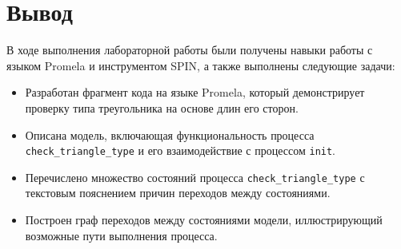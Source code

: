 \documentclass{bmstu}
\begin{document}
\clearpage
\section{Вывод}

В ходе выполнения лабораторной работы были получены навыки работы с языком Promela и инструментом SPIN, а также выполнены следующие задачи:
\begin{itemize}
  \item Разработан фрагмент кода на языке Promela, который демонстрирует проверку типа треугольника на основе длин его сторон.
  \item Описана модель, включающая функциональность процесса \texttt{check\_triangle\_type} и его взаимодействие с процессом \texttt{init}.
  \item Перечислено множество состояний процесса \texttt{check\_triangle\_type} с текстовым пояснением причин переходов между состояниями.
  \item Построен граф переходов между состояниями модели, иллюстрирующий возможные пути выполнения процесса.
\end{itemize}
\end{document}

